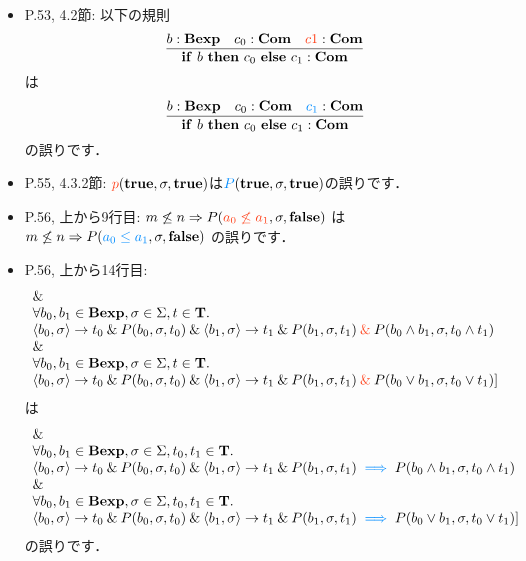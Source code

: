\documentclass[12pt,titlepage,twoside,openright,dvipdfmx]{jsbook}
\newcommand\old[1]{%
  \textcolor[rgb]{1.0,0.25,0.1}{#1}%
  }
\newcommand\new[1]{%
  \textcolor[rgb]{0,0.55,1.0}{#1}%
  }
\theoremstyle{definition}
\begin{document}
\begin{itemize}
  \ifnum {}
  \ifnum {}
  \item P.53, 4.2節: 以下の規則
  \[
    \infer
    {\mathbf{if}\ b\ \mathbf{then}\ c_0\ \mathbf{else}\ c_1:\mathbf{Com}}
    {b:\mathbf{Bexp} & c_0:\mathbf{Com} & \old{c1}:\mathbf{Com}}
  \]
  は
  \[
    \infer
    {\mathbf{if}\ b\ \mathbf{then}\ c_0\ \mathbf{else}\ c_1:\mathbf{Com}}
    {b:\mathbf{Bexp} & c_0:\mathbf{Com} & \new{c_1}:\mathbf{Com}}
  \]
  の誤りです．
\item P.55, 4.3.2節: $\old{p}(\Ttrue, \sigma,\Ttrue)$は$\new{P}(\Ttrue, \sigma, \Ttrue)$の誤りです．
\item P.56, 上から9行目:
  $m \not\le n \Rightarrow P(\old{a_0 \not\le a_1},\sigma,\mathbf{false})$
  は
  $m \not\le n \Rightarrow P(\new{a_0 \le a_1},\sigma,\mathbf{false})$
  の誤りです．
\item P.56, 上から14行目:
  \[
    \begin{array}{ll}
    \AND\\
    \forall{b_0,b_1\in\mathbf{Bexp},\sigma\in\Sigma,t\in\mathbf{T}}.\\
      \tuple{b_0,\sigma}\rightarrow t_0 \AND P(b_0,\sigma,t_0) \AND \tuple{b_1,\sigma}\rightarrow t_1 \AND P(b_1,\sigma,t_1) \old{{}\AND{}} P(b_0\wedge b_1,\sigma, t_0\wedge t_1)\\
      \AND\\
      \forall{b_0,b_1\in\mathbf{Bexp},\sigma\in\Sigma,t\in\mathbf{T}}.\\
      \tuple{b_0,\sigma}\rightarrow t_0 \AND P(b_0,\sigma,t_0) \AND \tuple{b_1,\sigma}\rightarrow t_1 \AND P(b_1,\sigma,t_1) \old{{}\AND{}} P(b_0\vee b_1,\sigma, t_0\vee t_1) \rbrack
    \end{array}
  \]
  は
  \[
    \begin{array}{ll}
    \AND\\
      \forall{b_0,b_1\in\mathbf{Bexp},\sigma\in\Sigma,t_0,t_1\in\mathbf{T}}.\\
      \tuple{b_0,\sigma}\rightarrow t_0 \AND P(b_0,\sigma,t_0) \AND \tuple{b_1,\sigma}\rightarrow t_1 \AND P(b_1,\sigma,t_1) \new{{}\implies{}} P(b_0\wedge b_1,\sigma, t_0\wedge t_1)\\
      \AND\\
      \forall{b_0,b_1\in\mathbf{Bexp},\sigma\in\Sigma,t_0,t_1\in\mathbf{T}}.\\
      \tuple{b_0,\sigma}\rightarrow t_0 \AND P(b_0,\sigma,t_0) \AND \tuple{b_1,\sigma}\rightarrow t_1 \AND P(b_1,\sigma,t_1) \new{{}\implies{}} P(b_0\vee b_1,\sigma, t_0\vee t_1) \rbrack
    \end{array}
  \]
  の誤りです．
  \fi
  \fi


\end{itemize}
\end{document}
